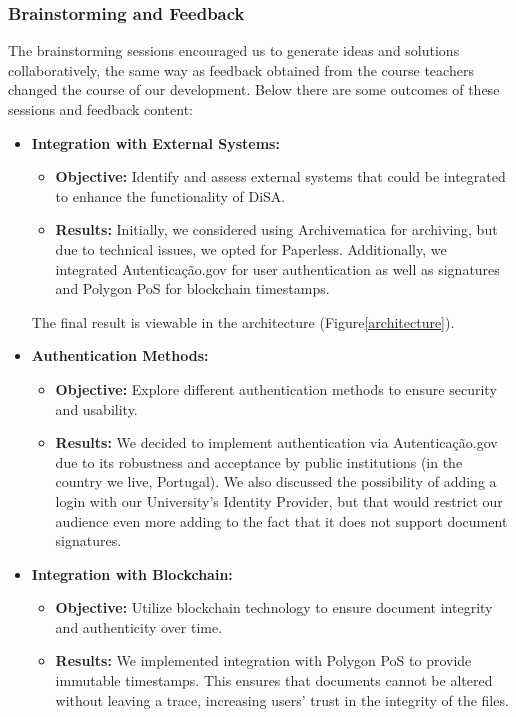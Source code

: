 \documentclass[a4paper,11pt]{article}
\begin{document}
            \subsubsection{Brainstorming and Feedback}
                \quad The brainstorming sessions encouraged us to generate ideas and solutions collaboratively, the same way as feedback obtained from the course teachers changed the course of our development. Below there are some outcomes of these sessions and feedback content:
                \begin{itemize}
                    \item \textbf{Integration with External Systems:}
                    \begin{itemize}
                        \item \textbf{Objective:} Identify and assess external systems that could be integrated to enhance the functionality of DiSA.
                        \item \textbf{Results:} Initially, we considered using Archivematica for archiving, but due to technical issues, we opted for Paperless. Additionally, we integrated Autenticação.gov for user authentication as well as signatures and Polygon PoS for blockchain timestamps.
                    \end{itemize}
                    The final result is viewable in the architecture (Figure\ref{architecture}).
        
                    \item \textbf{Authentication Methods:}
                    \begin{itemize}
                        \item \textbf{Objective:} Explore different authentication methods to ensure security and usability.
                        \item \textbf{Results:} We decided to implement authentication via Autenticação.gov due to its robustness and acceptance by public institutions (in the country we live, Portugal). We also discussed the possibility of adding a login with our University's Identity Provider, but that would restrict our audience even more adding to the fact that it does not support document signatures.
                    \end{itemize}

                    \pagebreak
                    \item \textbf{Integration with Blockchain:}
                    \begin{itemize}
                        \item \textbf{Objective:} Utilize blockchain technology to ensure document integrity and authenticity over time.
                        \item \textbf{Results:} We implemented integration with Polygon PoS to provide immutable timestamps. This ensures that documents cannot be altered without leaving a trace, increasing users' trust in the integrity of the files.
                    \end{itemize}
                

\end{itemize}
\end{document}

